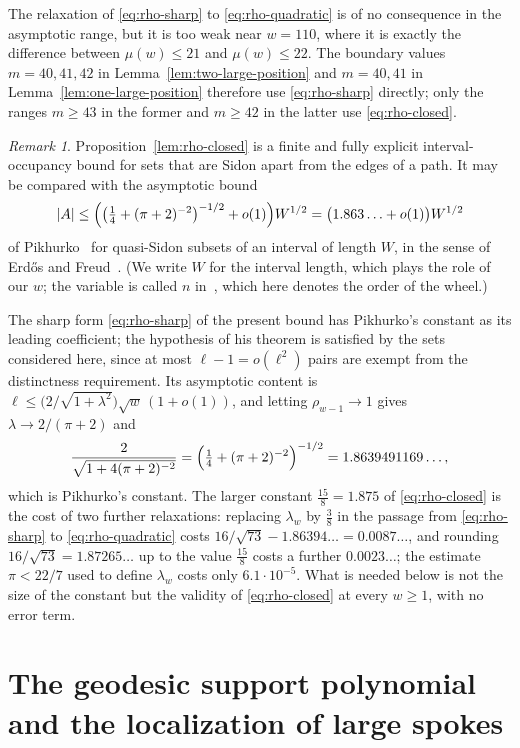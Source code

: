 \documentclass[11pt]{article}
\theoremstyle{definition}
\theoremstyle{remark}
\newtheorem{remark}[theorem]{Remark}
\numberwithin{equation}{section}
\DeclarePairedDelimiter{\abs}{\lvert}{\rvert}
\begin{document}
The relaxation of \eqref{eq:rho-sharp} to \eqref{eq:rho-quadratic} is of no consequence in
the asymptotic range, but it is too weak near $w=110$, where it is exactly
the difference between $\mu(w)\le21$ and $\mu(w)\le22$. The boundary
values $m=40,41,42$ in Lemma~\ref{lem:two-large-position} and $m=40,41$ in
Lemma~\ref{lem:one-large-position} therefore use \eqref{eq:rho-sharp} directly;
only the ranges $m\ge43$ in the former and $m\ge42$ in the latter use
\eqref{eq:rho-closed}.

\begin{remark}\label{rem:pikhurko}
Proposition~\ref{lem:rho-closed} is a finite and fully explicit interval-occupancy bound
for sets that are Sidon apart from the edges of a path. It may be compared with the
asymptotic bound
\[
  \abs A\le\Bigl(\bigl(\tfrac14+(\pi+2)^{-2}\bigr)^{-1/2}+o(1)\Bigr)W^{1/2}
  =\bigl(1.863\ldots+o(1)\bigr)W^{1/2}
\]
of Pikhurko~\cite[Theorem~3]{Pikhurko2006} for quasi-Sidon subsets of an interval
of length $W$, in the sense of Erd\H os and Freud~\cite{ErdosFreud1991}. (We write
$W$ for the interval length, which plays the role of our $w$; the variable is
called $n$ in~\cite{Pikhurko2006}, which here denotes the order of the wheel.)

The sharp form \eqref{eq:rho-sharp} of the present bound has Pikhurko's constant
as its leading coefficient; the hypothesis of his theorem is satisfied by the sets
considered here, since at most $\ell-1=o(\ell^2)$ pairs are exempt from the
distinctness requirement. Its asymptotic content is $\ell\le\bigl(2/\sqrt{1+\lambda^2}\bigr)
\sqrt w\,(1+o(1))$, and letting $\rho_{w-1}\to1$ gives $\lambda\to2/(\pi+2)$ and
\[
  \frac2{\sqrt{1+4(\pi+2)^{-2}}}
  =\Bigl(\tfrac14+(\pi+2)^{-2}\Bigr)^{-1/2}
  =1.8639491169\ldots,
\]
which is Pikhurko's constant. The larger constant $\tfrac{15}8=1.875$ of
\eqref{eq:rho-closed} is the cost of two further relaxations: replacing
$\lambda_w$ by $\tfrac38$ in the passage from \eqref{eq:rho-sharp} to
\eqref{eq:rho-quadratic} costs $16/\sqrt{73}-1.86394\ldots=0.0087\ldots$, and
rounding $16/\sqrt{73}=1.87265\ldots$ up to the value $\tfrac{15}8$
costs a further $0.0023\ldots$; the estimate $\pi<22/7$ used to define $\lambda_w$
costs only $6.1\cdot10^{-5}$. What is needed below is not the size of the constant
but the validity of \eqref{eq:rho-closed} at every $w\ge1$, with no error term.
\end{remark}

\section{The geodesic support polynomial and the localization of large spokes}\label{sec:support-localization}
\end{document}
